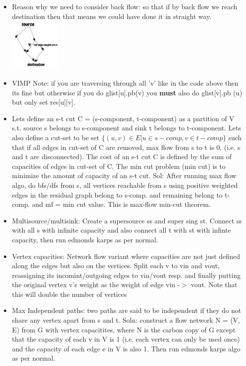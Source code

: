 \documentclass[8pt, a4paper, oneside, twocolumn]{extarticle}
\begin{document}
\begin{itemize}[leftmargin=*]
    \item Reason why we need to consider back flow: so that if by back flow we reach destination then that means we could have done it in straight way. 
    \\\includegraphics[width=0.2\textwidth,height=0.2\textheight,keepaspectratio]{bflow} 
    \item VIMP Note: if you are traversing through all 'v' like in the code above then its fine but otherwise if you do glist[u].pb(v) you \textbf{must} also do glist[v].pb (u) but only set res[u][v].
    \item Lets define an s-t cut C = (s-component, t-component) as a partition of V s.t. source s belongs to s-component and sink t belongs to t-component. Lets also define a cut-set to be set $\{(u, v) \in E | u \in s-comp, v \in t-comp\}$ such that if all edges in cut-set of C are removed, max flow from s to t is 0. (i.e. s and t are disconnected). The cost of an s-t cut C is defined by the sum of capacities of edges in cut-set of C. The min cut problem (min cut) is to minimize the amount of capacity of an s-t cut. Sol: After running max flow algo, do bfs/dfs from s, all vertices reachable from s using positive weighted edges in the residual graph belong to s-comp. and remaining belong to t-comp. and mf = min cut value. This is max-flow min-cut theorem.
    \item Multisource/multisink: Create a supersource ss and super sing st. Connect ss with all s with infinite capacity and also connect all t with st with infinte capacity, then run edmonds karps as per normal.
    \item Vertex capacities: Network flow variant where capacities are not just defined along the edges but also on the vertices. Split each v to vin and vout, reassigning its incomint/outgoing edges to vin/vout resp. and finally putting the original vertex v's weight as the weight of edge vin -$>$ vout. Note that this will double the number of vertices
    \item Max Independent paths: two paths are said to be independent if they do not share any vertex apart from s and t. Soln: construct a flow network N = (V, E) from G with vertex capacitites, where N is the carbon copy of G except that the capacity of each v in V is 1 (i.e. each vertex can only be used once) and the capacity of each edge e in V is also 1. Then run edmonds karps algo as per normal.

\end{itemize}
\end{document}
